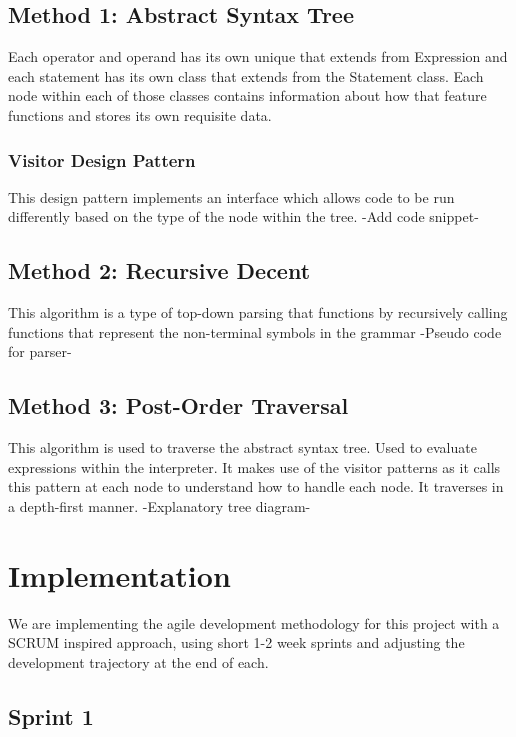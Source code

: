 \documentclass[a4paper, oneside, 11pt]{report}
\begin{document}
\section{Method 1: Abstract Syntax Tree}

Each operator and operand has its own unique that extends from Expression and each
statement has its own class that extends from the Statement class. Each node within
each of those classes contains information about how that feature functions and stores its
own requisite data.

\subsection{Visitor Design Pattern}

This design pattern implements an interface which allows code to be run differently based
on the type of the node within the tree.
-Add code snippet-

\section{Method 2: Recursive Decent}

This algorithm is a type of top-down parsing that functions by recursively calling functions that represent the non-terminal symbols in the grammar
-Pseudo code for parser-

\section{Method 3: Post-Order Traversal}

This algorithm is used to traverse the abstract syntax tree. Used to evaluate expressions
within the interpreter. It makes use of the visitor patterns as it calls this pattern at each
node to understand how to handle each node. It traverses in a depth-first manner.
-Explanatory tree diagram-



\chapter{Implementation}\label{Impl}

We are implementing the agile development methodology for this project with a SCRUM inspired approach, using short 1-2 week sprints and adjusting the development trajectory at the end of each.

\section{Sprint 1}
\end{document}
